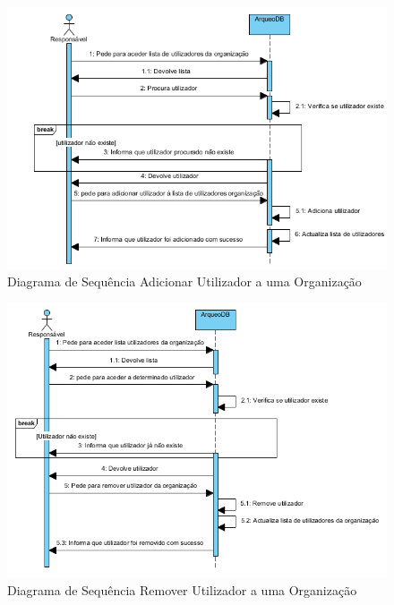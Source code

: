 ﻿\documentclass[12pt,a4paper]{article}
\begin{document}
\begin{figure}[h!]
\centering
\includegraphics[scale=1]{sequencia/adicionarutilizador}
\caption{Diagrama de Sequência Adicionar Utilizador a uma Organização} 
\end{figure}  


\begin{figure}[h!]
\centering
\includegraphics[scale=1]{sequencia/removerutilizador}
\caption{Diagrama de Sequência Remover Utilizador a uma Organização} 
\end{figure}  
\end{document}
